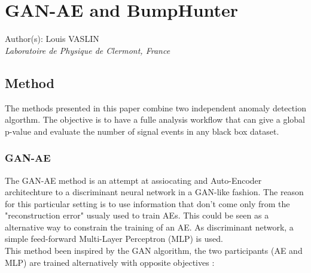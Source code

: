 \documentclass[letterpaper,11pt]{article}
\begin{document}
\section*{GAN-AE and BumpHunter}
Author(s): Louis VASLIN \\ \textit{Laboratoire de Physique de Clermont, France}\\


\subsection{Method}
\label{sec:method}

\noindent The methods presented in this paper combine two independent anomaly detection algorthm.
The objective is to have a fulle analysis workflow that can give a global p-value and evaluate the number of signal events in any black box dataset.

\subsubsection{GAN-AE}
\label{sec:GAN-AE}

\noindent The GAN-AE method is an attempt at assiocating and Auto-Encoder architechture to a discriminant neural network in a GAN-like fashion.
The reason for this particular setting is to use information that don't come only from the "reconstruction error" usualy used to train AEs.
This could be seen as a alternative way to constrain the training of an AE.
As discriminant network, a simple feed-forward Multi-Layer Perceptron (MLP) is used. \\

\noindent This method been inspired by the GAN algorithm, the two participants (AE and MLP) are trained alternatively with opposite objectives :
\end{document}
